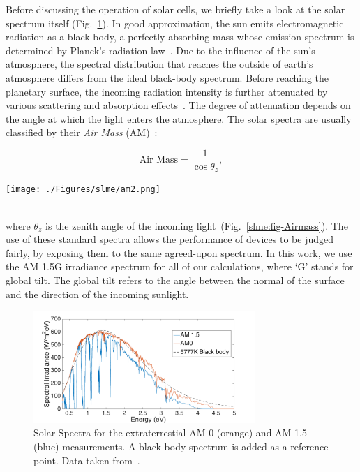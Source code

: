 \begin{refsection}
Before discussing the operation of solar cells, we briefly take a look at the 
solar spectrum itself (Fig.~\ref{slme:fig-solar}). In good approximation, the 
sun emits electromagnetic radiation as a black body, a perfectly absorbing 
mass whose emission spectrum is determined by Planck's radiation 
law~\cite{Planck1901}. Due to the influence of the sun's atmosphere, the 
spectral distribution that reaches the outside of earth's atmosphere differs 
from the ideal black-body spectrum. Before reaching the planetary surface, the 
incoming radiation intensity is further attenuated by various scattering and 
absorption effects~\cite{Bird1986}. The degree of attenuation depends on the 
angle at which the light enters the atmosphere. The solar spectra are usually 
classified by their \textit{Air Mass} (AM)~\cite{Green1981}: 
\begin{minipage}{1\textwidth} 
\begin{minipage}{0.4\textwidth} 
\begin{equation} 
\text{Air Mass} = \frac{1}{\cos \theta_z}, 
\end{equation} 
\end{minipage} 
\begin{minipage}{0.6\textwidth} 
\centering 
\texttt{[image: ./Figures/slme/am2.png]} 
\end{minipage} 
\end{minipage} 
\vspace{0.2in}\\ 
where $\theta_z$ is the zenith angle of the incoming 
light~(Fig.~\ref{slme:fig-Airmass}). The use of these standard spectra allows 
the performance of devices to be judged fairly, by exposing them to the same 
agreed-upon spectrum. In this work, we use the AM 1.5G irradiance spectrum for 
all of our calculations, where `G' stands for global tilt. The global tilt 
refers to the angle between the normal of the surface and the direction of the 
incoming sunlight. 
 
\begin{figure}[!htp]  
\centering 
\includegraphics[width=0.75\textwidth]{./Figures/slme/SolarSpectrum.png} 
\caption{\label{slme:fig-solar} Solar Spectra for the extraterrestial AM 0 
(orange) and AM 1.5 (blue) measurements. A black-body spectrum is added as a 
reference point. Data taken from~\cite{International2012}.} 
\end{figure} 
 

\end{refsection}
